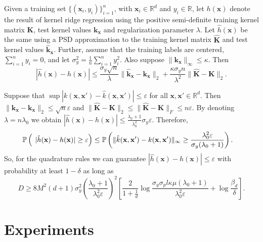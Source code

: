 \begin{proposition}
Given a training set $\{(\mathbf{x}_i, y_i)\}_{i = 1}^n$, with $\mathbf{x}_i \in \mathbb{R}^d$ and $y_i \in \mathbb{R}$,
let $h(\mathbf{x})$ denote the result of kernel ridge regression using the positive semi-definite training kernel matrix $\mathbf{K}$, test kernel values $\mathbf{k}_\mathbf{x}$
and regularization parameter $\lambda$.
Let $\hat{h}(\mathbf{x})$ be the same using a PSD approximation to the training kernel matrix $\widehat{\mathbf{K}}$ and test kernel values $\hat{\mathbf{k}}_\mathbf{x}$.
Further, assume that the training labels are centered, $\sum_{i = 1}^n y_i = 0$,
and let $\sigma_y^2 = \frac{1}{n} \sum_{i = 1}^n y_i^2$.
Also suppose $\|\mathbf{k}_\mathbf{x}\|_{\infty} \leq \kappa$.
Then
\[
|\hat{h}(\mathbf{x}) - h(\mathbf{x})| \leq \frac{\sigma_y\sqrt{n}}{\lambda} \|\hat{\mathbf{k}}_\mathbf{x} - \mathbf{k}_\mathbf{x}\|_2 +
\frac{\kappa\sigma_yn}{\lambda^2} \|\widehat{\mathbf{K}} - \mathbf{K}\|_2.
\]
\end{proposition}
Suppose that $\sup |k(\mathbf{x}, \mathbf{x'}) - \hat{k}(\mathbf{x}, \mathbf{x'})| \leq \varepsilon$ for all $\mathbf{x}, \mathbf{x'} \in \mathbb{R}^d$.
Then $\|\hat{\mathbf{k}}_\mathbf{x} - \mathbf{k}_\mathbf{x}\|_2 \leq \sqrt{n}\varepsilon$ and
$\|\widehat{\mathbf{K}} - \mathbf{K}\|_2 \leq \|\widehat{\mathbf{K}} - \mathbf{K}\|_F \leq n\varepsilon$.
By denoting $\lambda = n \lambda_0$ we obtain
$
|\hat{h}(\mathbf{x}) - h(\mathbf{x})| \leq
\frac{\lambda_0 + 1}{\lambda_0^2} \sigma_y \varepsilon.
$
Therefore,
\begin{align*}
\mathbb{P} \left (\vphantom{|\hat{h}(x)} \right .&
\left . |\hat{h}(\mathbf{x}) - h(\mathbf{x})| \geq \varepsilon \right ) \leq
\mathbb{P} \left (
\|\hat{k}(\mathbf{x}, \mathbf{x'}) - k(\mathbf{x}, \mathbf{x}')\|_{\infty} \geq \frac{\lambda_0^2 \varepsilon}{\sigma_y(\lambda_0 + 1)}
\right ).
\end{align*}
So, for the quadrature rules we can guarantee $|\hat{h}(\mathbf{x}) - h(\mathbf{x})| \leq \varepsilon$ with probability at least $1 - \delta$ as long as
\[
D \geq 8M^2(d + 1)\sigma_y^2 \left ( \frac{\lambda_0 + 1}{\lambda_0^2 \varepsilon} \right )^2  \left [
\frac{2}{1 + \frac{1}{d}}\log \frac{\sigma_y \sigma_p l \kappa \mu(\lambda_0 + 1)}{\lambda_0^2 \varepsilon} +
\log \frac{\beta_d}{\delta}
\right ].
\]


\section{Experiments}
\label{sec:quadrature_experiments}

